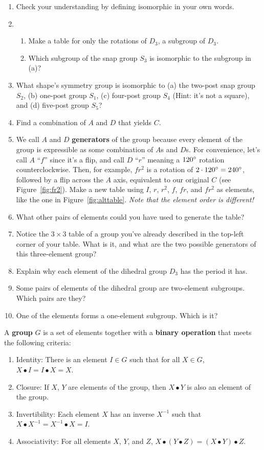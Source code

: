 \documentclass[../textbook.tex]{subfiles}
\begin{document}
\begin{enumerate}
\setcounter{enumi}{\theenumLast}
\item Check your understanding by defining isomorphic in your own words.
\item \begin{enumerate}
\item Make a table for only the rotations of $D_3$, a subgroup of $D_3$.
\item Which subgroup of the snap group $S_3$ is isomorphic to the subgroup in (a)?
\end{enumerate}
\item What shape's symmetry group is isomorphic to (a) the two-post snap group $S_2$, (b) one-post group $S_1$, (c) four-post group $S_4$ (Hint: it's not a square), and (d) five-post group $S_5$? %
\item Find a combination of $A$ and $D$ that yields $C$.
\item We call $A$ and $D$ \textbf{generators} of the group because every element of the group is expressible as some combination of $A$s and $D$s. For convenience, let's call $A$ ``$f$'' since it's a flip, and call $D$ ``$r$'' meaning a $120^\circ$ rotation counterclockwise. Then, for example, $fr^2$ is a rotation of $2\cdot 120^\circ = 240^\circ$, followed by a flip across the $A$ axis, equivalent to our original $C$ (see Figure~\ref{fig:fr2}). Make a new table using $I$, $r$, $r^2$, $f$, $fr$, and $fr^2$ as elements, like the one in Figure~\ref{fig:alttable}. \textit{Note that the element order is different!} %
\item What other pairs of elements could you have used to generate the table?
\item Notice the $3\times 3$ table of a group you've already described in the top-left corner of your table. What is it, and what are the two possible generators of this three-element group?
\item Explain why each element of the dihedral group $D_3$ has the period it has.
\item Some pairs of elements of the dihedral group are two-element subgroups. Which pairs are they?
\item One of the elements forms a one-element subgroup. Which is it?
\setcounter{enumLast}{\theenumi}
\end{enumerate}
A \textbf{group} $G$ is a set of elements together with a \textbf{binary operation} that meets the following criteria:
\begin{enumerate}[label=(\alph*)]
\item Identity: There is an element $I\in G$ such that for all $X\in G$, $X\bullet I = I\bullet X = X$.
\item Closure: If $X$, $Y$ are elements of the group, then $X\bullet Y$ is also an element of the group.
\item Invertibility: Each element $X$ has an inverse $X^{-1}$ such that $X\bullet X^{-1} = X^{-1}\bullet X = I$.
\item Associativity: For all elements $X$, $Y$, and $Z$, $X\bullet (Y\bullet Z) = (X\bullet Y) \bullet Z$.
\end{enumerate}
\end{document}
